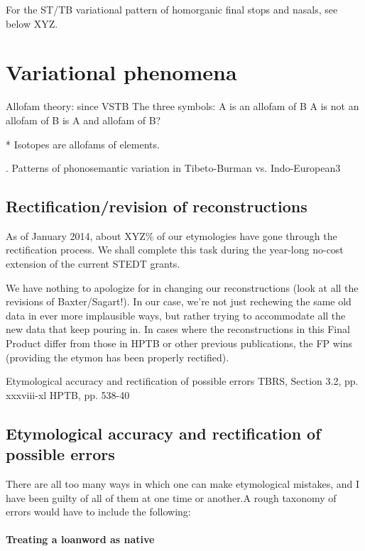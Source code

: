 For the ST/TB variational pattern of homorganic final stops and nasals, see below XYZ.


\section{Variational phenomena}
Allofam theory: since VSTB
	The three symbols: 	A is an allofam of B
				A is not an allofam of B
				is A and allofam of B?

* Isotopes are allofams of elements.


. Patterns of phonosemantic variation in Tibeto-Burman vs. Indo-European3

	
	
\subsection{Rectification/revision of reconstructions}

As of January 2014, about XYZ\% of our etymologies have gone through the rectification process. We shall complete this task during the year-long no-cost extension of the current STEDT grants.

We have nothing to apologize for in changing our reconstructions (look at all the revisions of Baxter/Sagart!). In our case, we’re not just rechewing the same old data in ever more implausible ways, but rather trying to accommodate all the new data that keep pouring in. 
In cases where the reconstructions in this Final Product differ from those in HPTB or other previous publications, the FP wins (providing the etymon has been properly rectified).

Etymological accuracy and rectification of possible errors
	TBRS, Section 3.2, pp. xxxviii-xl
	HPTB, pp. 538-40
	
\subsection[Etymological accuracy and rectification of possible errors]{Etymological accuracy and rectification of possible errors}

There are all too many ways in which one can make etymological mistakes, and
I have been guilty of all of them at one time or another.\footnotemark A rough taxonomy of
errors would have to include the following:


\paragraph{Treating a loanword as native}

